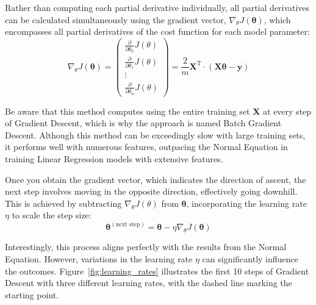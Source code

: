 \documentclass[12pt,letter]{article}
\begin{document}
Rather than computing each partial derivative individually, all partial derivatives can be calculated simultaneously using the gradient vector, $\nabla_\theta J(\pmb{\theta})$, which encompasses all partial derivatives of the cost function for each model parameter:
\begin{equation}
	\nabla_\theta J(\pmb{\theta}) = \begin{pmatrix}
	\frac{\partial}{\partial \theta_0} J(\theta) \\
	\frac{\partial}{\partial \theta_1} J(\theta) \\
	\vdots  \\
	\frac{\partial}{\partial \theta_n} J(\theta)
	\end{pmatrix}
	= \frac{2}{m} \textbf{X}^\text{T} \cdot (\textbf{X} \pmb{\theta} - \textbf{y})
\end{equation}

\begin{mdframed}[middlelinewidth=0.5mm]
\begin{center}
\end{center}
Be aware that this method computes using the entire training set $\textbf{X}$ at every step of Gradient Descent, which is why the approach is named Batch Gradient Descent. Although this method can be exceedingly slow with large training sets, it performs well with numerous features, outpacing the Normal Equation in training Linear Regression models with extensive features.
\end{mdframed}

\pagebreak

Once you obtain the gradient vector, which indicates the direction of ascent, the next step involves moving in the opposite direction, effectively going downhill. This is achieved by subtracting $\nabla_\theta J(\theta)$ from $\pmb{\theta}$, incorporating the learning rate $\eta$ to scale the step size:
\begin{equation}
\pmb{\theta}^{(\text{next step})} = \pmb{\theta} - \eta \nabla_\theta J(\pmb{\theta})
\end{equation}

Interestingly, this process aligns perfectly with the results from the Normal Equation. However, variations in the learning rate $\eta$ can significantly influence the outcomes. Figure~\ref{fig:learning_rates} illustrates the first 10 steps of Gradient Descent with three different learning rates, with the dashed line marking the starting point.
\end{document}
